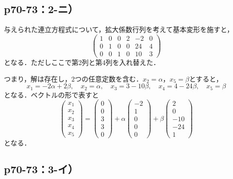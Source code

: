\documentclass[uplatex,dvipdfmx,a4paper,10pt,fleqn]{jsarticle}
\begin{document}
\subsection*{p70-73：2-ニ）}

\begin{tleftbar}
    与えられた連立方程式について，拡大係数行列を考えて基本変形を施すと，
    \[
        \begin{pmatrix} 1 & 0 & 0  & 2 & -2 & 0  \\ 0 & 1& 0  & 0 & 24 & 4 \\ 0 & 0 & 1 & 0 & 10 & 3 \end{pmatrix}
    \]
    となる．ただしここで第2列と第4列を入れ替えた．

    つまり，解は存在し，$2$つの任意定数を含む．$x_2 = \alpha$，$x_5 = \beta$とすると，
    \[
        x_1 = -2\alpha + 2\beta  , \quad x_2 =\alpha  , \quad x_3 = 3 -10\beta  , \quad x_4 = 4 -24 \beta ,\quad x_5 =\beta 
    \]
    となる．ベクトルの形で表すと
    \[
        \begin{pmatrix} x_1 \\ x_2 \\ x_3 \\ x_4 \\ x_5 \end{pmatrix}= \begin{pmatrix} 0 \\ 0 \\ 3 \\ 3 \\ 0 \end{pmatrix} +\alpha \begin{pmatrix} -2 \\ 1\\ 0 \\ 0 \\ 0 \end{pmatrix} + \beta \begin{pmatrix} 2 \\ 0 \\ -10 \\ -24 \\ 1 \end{pmatrix}
    \]
    となる．
\end{tleftbar}


\newpage
    \subsection*{p70-73：3-イ）}
\end{document}
